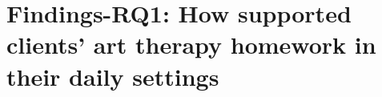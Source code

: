 \section{Findings-RQ1: How \name{} supported clients' art therapy homework in their daily settings}
